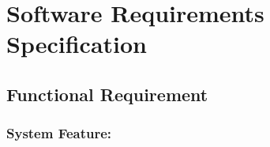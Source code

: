 







  
\newpage
\section{Software Requirements Specification}
\subsection{Functional Requirement}
\subsubsection{System Feature:}


